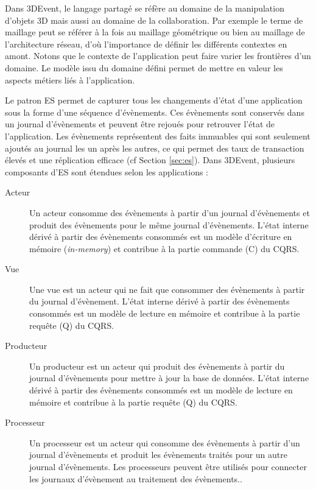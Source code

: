 Dans 3DEvent, le langage partagé se réfère au domaine de la manipulation 
d'objets 3D mais aussi au domaine de la collaboration. Par exemple le terme de 
maillage peut se référer à la fois au maillage géométrique ou bien au maillage de 
l'architecture réseau, d'où l'importance de définir les différents contextes en amont. 
Notons que le contexte de l'application peut faire varier les frontières d'un 
domaine. Le modèle issu du domaine défini permet de mettre en valeur les 
aspects métiers liés à l'application.



Le patron \gls{ES} permet de capturer tous les changements d'état 
d'une application sous la forme d'une séquence d'évènements. 
Ces évènements sont conservés dans un journal d'évènements et peuvent être 
rejoués pour retrouver l'état de l'application. 
Les évènements représentent des faits immuables qui sont 
seulement ajoutés au journal les un après les autres, ce qui permet des taux de 
transaction élevés et une réplication efficace (cf Section 
\ref{sec:es}). Dans 3DEvent, plusieurs composants d'\gls{ES} sont étendues selon 
les applications :

\begin{description}
	\item[Acteur] Un acteur consomme des évènements à partir d'un journal 
	d'évènements et produit des évènements pour le même journal d'évènements. 
	L'état interne dérivé à partir des évènements consommés est un modèle 
	d'écriture 
	en mémoire (\textit{in-memory}) et contribue à la partie commande (C) du 
	CQRS.
	\item[Vue] Une vue est un acteur qui ne fait que consommer des évènements à 
	partir du journal d'évènement. L'état interne dérivé à partir des évènements 
	consommés est un modèle de lecture en mémoire et contribue à la partie 
	requête (Q) du CQRS.
	\item[Producteur] Un producteur est un acteur qui produit des évènements à 
	partir 
	du journal d'évènements pour mettre à jour la base de données. L'état interne 
	dérivé 
	à partir des évènements consommés est un modèle de lecture en mémoire et 
	contribue à la partie requête (Q) du CQRS.
	\item[Processeur] Un processeur est un acteur qui consomme des évènements 
	à 
	partir d'un journal d'évènements et produit les évènements traités pour un autre 
	journal d'évènements. Les processeurs peuvent être utilisés pour connecter les 
	journaux d'évènement au traitement des évènements..
	
\end{description}

